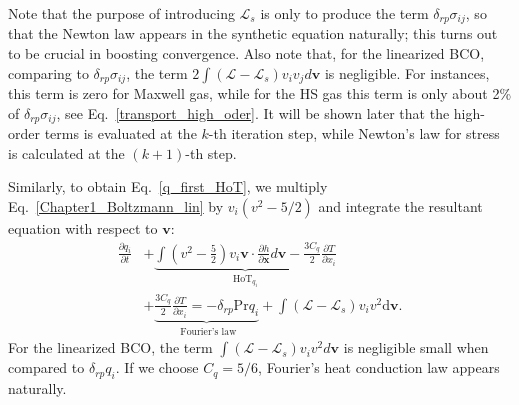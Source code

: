 Note that the purpose of introducing $\mathcal{L}_s$ is only to produce the term $\delta_{rp}\sigma_{ij}$, so that the Newton law appears in the synthetic equation naturally; this turns out to be crucial in boosting convergence. Also note that, for the linearized BCO, comparing to $\delta_{rp}\sigma_{ij}$, the term $2\int{(\mathcal{L}-\mathcal{L}_s)v_iv_j} d\bm{v}$ is negligible. For instances,  this term is zero for Maxwell gas, while for the HS gas this term is only about 2\% of $\delta_{rp}\sigma_{ij}$, see Eq.~\eqref{transport_high_oder}. It will be shown later that the high-order terms is evaluated at the $k$-th iteration step, while Newton's law for stress is calculated at the $(k+1)$-th step. 






Similarly, to obtain Eq.~\eqref{q_first_HoT}, we multiply Eq.~\eqref{Chapter1_Boltzmann_lin} by $v_i(v^2-5/2)$ and integrate the resultant equation with respect to $\bm{v}$:
\begin{equation}\label{HoT_q}
\begin{aligned}
\frac{\partial q_{i}}{\partial {t}}
&+\underbrace{ \int{\left(v^2-\frac{5}{2}\right)}v_i \bm{v}\cdot\frac{\partial h}{\partial \bm{x}}d\bm{v}
		-\frac{3C_q}{2}\frac{\partial{T}}{\partial {x_{i}}
} }_{\text{HoT}_{q_i}} \\
&+\underbrace{\frac{3C_q}{2}\frac{\partial{T}}{\partial {x_{i}}}=-\delta_{rp}\text{Pr}q_{i}}_{\text{ Fourier's law}}+\int{(\mathcal{L}-\mathcal{L}_s)v_iv^2} \mathrm{d}\bm{v}.
\end{aligned}
\end{equation}
For the linearized BCO, the term $\int{(\mathcal{L}-\mathcal{L}_s)v_iv^2} d\bm{v}$ is negligible small when compared to $\delta_{rp}q_{i}$. If we choose $C_q=5/6$, Fourier's heat conduction law appears naturally. 




